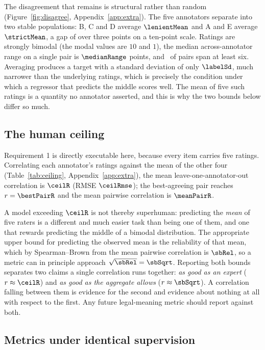 \documentclass[11pt]{article}
\begin{document}
The disagreement that remains is structural rather than random
(Figure~\ref{fig:disagree}, Appendix~\ref{app:extra}). The five annotators
separate into two stable populations: B, C and D average $\lenientMean$ and A
and E average $\strictMean$, a gap of over three points on a ten-point scale.
Ratings are strongly bimodal (the modal values are $10$ and $1$), the median
across-annotator range on a single pair is $\medianRange$ points, and
\pctSpreadSix\ of pairs span at least six. Averaging produces a target with a
standard deviation of only $\labelSd$, much narrower than the underlying
ratings, which is precisely the condition under which a regressor that predicts
the middle scores well. The mean of five such ratings is a quantity no annotator
asserted, and this is why the two bounds below differ so much.

\subsection{The human ceiling}
\label{sec:ceiling}

Requirement 1 is directly executable here, because every item carries five
ratings. Correlating each annotator's ratings against the mean of the other four
(Table~\ref{tab:ceiling}, Appendix~\ref{app:extra}), the mean
leave-one-annotator-out correlation is $\ceilR$ (RMSE $\ceilRmse$); the
best-agreeing pair reaches $r=\bestPairR$ and the mean pairwise correlation is
$\meanPairR$.

A model exceeding $\ceilR$ is not thereby superhuman: predicting the \emph{mean}
of five raters is a different and much easier task than being one of them, and
one that rewards predicting the middle of a bimodal distribution. The
appropriate upper bound for predicting the observed mean is the reliability of
that mean, which by Spearman--Brown from the mean pairwise correlation is
$\sbRel$, so a metric can in principle approach $\sqrt{\sbRel}=\sbSqrt$.
Reporting both bounds separates two claims a single correlation runs together:
\emph{as good as an expert} ($r \approx \ceilR$) and \emph{as good as the
aggregate allows} ($r \approx \sbSqrt$). A correlation falling between them is
evidence for the second and evidence about nothing at all with respect to the
first. Any future legal-meaning metric should report against both.

\subsection{Metrics under identical supervision}
\label{sec:baselines}
\end{document}
